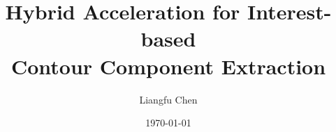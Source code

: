 \documentclass[8pt]{beamer}
\title[Master Thesis Presentation]{Hybrid Acceleration for Interest-based \\ Contour Component Extraction}
\author{Liangfu Chen}                 %
\institute[V.R. Lab.]{School of Computer Science \& Engineering\\Chung-Ang University}      %
\date{\today}                    %
\begin{document}
\begin{frame}
  \titlepage
\end{frame}
\note{}





\end{document}
